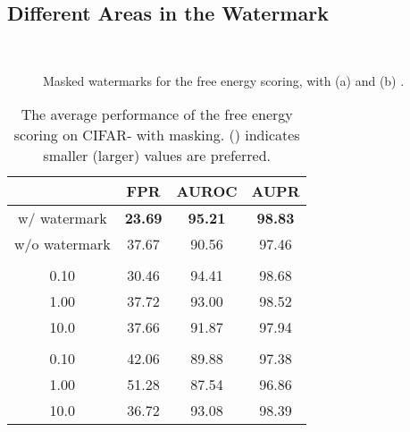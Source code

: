 \documentclass{article}
\begin{document}
\subsection{Different Areas in the Watermark} 

\begin{figure}[t]
    \centering
    ~~~~~~~~~~~~~~~~~~~~~~~~~~~~~~~~~~~~

    \caption{{Masked watermarks for the free energy scoring, with (a)  and (b) .}}
    \label{fig:masked}

\end{figure}

\begin{table}\centering
\caption{{The average performance of the free energy scoring on CIFAR- with masking.  () indicates smaller (larger) values are preferred.}} \label{tab: masked}
\vspace{5pt}
\scriptsize
{
\begin{tabular}{c|ccc}
\toprule[1.5pt]
& FPR      & AUROC        & AUPR       \\
\midrule[0.6pt]
w/ watermark & \textbf{23.69} & \textbf{95.21} & \textbf{98.83} \\
w/o watermark & 37.67 & 90.56 & 97.46 \\
\midrule[0.6pt]
\multicolumn{4}{c}{\cellcolor{greyL}} \\
\midrule[0.6pt]
0.10 & 30.46 & 94.41 & 98.68 \\
1.00 & 37.72 & 93.00 & 98.52 \\
10.0 & 37.66 & 91.87 & 97.94 \\
\midrule[0.6pt]
\multicolumn{4}{c}{\cellcolor{greyL}} \\
\midrule[0.6pt]
0.10 & 42.06 & 89.88 & 97.38 \\
1.00 & 51.28 & 87.54 & 96.86 \\
10.0 & 36.72 & 93.08 & 98.39 \\
\bottomrule[1.5pt]
\end{tabular}
}
\end{table}
\end{document}
